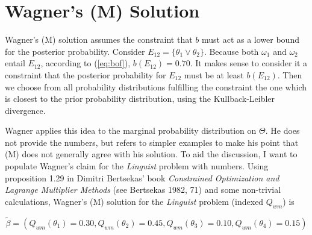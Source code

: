 \documentclass[12pt]{article}
\begin{document}
\section{Wagner's (M) Solution}
\label{WagnersMSolution}

Wagner's (M) solution assumes the constraint that $b$ must act as a
lower bound for the posterior probability. Consider
$E_{12}=\{\theta_{1}\vee\theta_{2}\}$. Because both $\omega_{1}$ and
$\omega_{2}$ entail $E_{12}$, according to (\ref{eq:bof}),
$b(E_{12})=0.70$. It makes sense to consider it a constraint that the
posterior probability for $E_{12}$ must be at least $b(E_{12})$. Then
we choose from all probability distributions fulfilling the constraint
the one which is closest to the prior probability distribution, using
the Kullback-Leibler divergence.

Wagner applies this idea to the marginal probability distribution on
$\Theta$. He does not provide the numbers, but refers to simpler
examples to make his point that (M) does not generally agree with his
solution. To aid the discussion, I want to populate Wagner's claim for
the \emph{Linguist} problem with numbers. Using proposition 1.29 in
Dimitri Bertsekas' book \emph{Constrained Optimization and Lagrange
  Multiplier Methods} (see Bertsekas 1982, 71) and some non-trivial
calculations, Wagner's (M) solution for the \emph{Linguist} problem
(indexed $Q_{wm}$) is

\begin{equation}
  \label{eq:p13}
  \tilde{\beta}=(Q_{wm}(\theta_{1})=0.30,Q_{wm}(\theta_{2})=0.45,Q_{wm}(\theta_{3})=0.10,Q_{wm}(\theta_{4})=0.15)
\end{equation}

\end{document}
